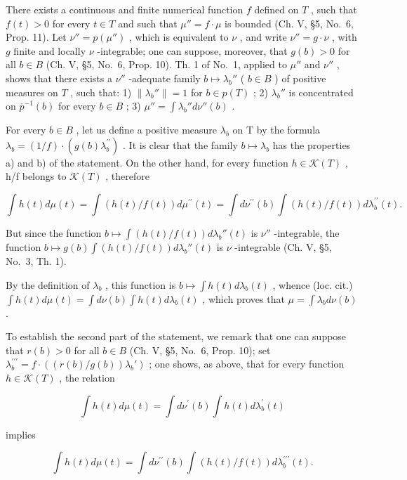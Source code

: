 There exists a continuous and finite numerical function \(f\) defined on \(T\) , such that \(f(t) > 0\) for every \(t \in T\) and such that \(\mu'' = f \cdot \mu\) is bounded (Ch. V, §5, No.~6, Prop. 11). Let \(\nu'' = p(\mu'')\) , which is equivalent to \(\nu\) , and write \(\nu'' = g \cdot \nu\) , with \(g\) finite and locally \(\nu\) -integrable; one can suppose, moreover, that \(g(b) > 0\) for all \(b \in B\) (Ch. V, §5, No.~6, Prop. 10). Th. 1 of No.~1, applied to \(\mu''\) and \(\nu''\) , shows that there exists a \(\nu''\) -adequate family \(b \mapsto \lambda_b''\) ( \(b \in B\) ) of positive measures on \(T\) , such that: 1) \(\| \lambda_b'' \| = 1\) for \(b \in p(T)\) ; 2) \(\lambda_b''\) is concentrated on \(\overline{p}^{-1}(b)\) for every \(b \in B\) ; 3) \(\mu'' = \int \lambda_b'' d\nu''(b)\) .

For every \(b \in B\) , let us define a positive measure \(\lambda_{b}\) on T by the formula \(\lambda_{b} = (1/f) \cdot (g(b)\lambda_{b}^{\prime\prime})\) . It is clear that the family \(b \mapsto \lambda_{b}\) has the properties a) and b) of the statement. On the other hand, for every function \(h \in \mathcal{K}(T)\) , h/f belongs to \(\mathcal{K}(T)\) , therefore

\[
\int h (t) d \mu (t) = \int \left(h (t) / f (t)\right) d \mu^ {\prime \prime} (t) = \int d \nu^ {\prime \prime} (b) \int \left(h (t) / f (t)\right) d \lambda_ {b} ^ {\prime \prime} (t).
\]

But since the function \(b \mapsto \int (h(t) / f(t)) d\lambda_b''(t)\) is \(\nu''\) -integrable, the function \(b \mapsto g(b) \int (h(t) / f(t)) d\lambda_b''(t)\) is \(\nu\) -integrable (Ch. V, §5, No.~3, Th. 1).

By the definition of \(\lambda_b\) , this function is \(b \mapsto \int h(t) d\lambda_b(t)\) , whence (loc. cit.) \(\int h(t) d\mu(t) = \int d\nu(b) \int h(t) d\lambda_b(t)\) , which proves that \(\mu = \int \lambda_b d\nu(b)\) .

To establish the second part of the statement, we remark that one can suppose that \(r(b) > 0\) for all \(b \in B\) (Ch. V, §5, No.~6, Prop. 10); set \(\lambda_b^{\prime \prime \prime} = f \cdot \left( \left( r(b) / g(b) \right) \lambda_b' \right)\) ; one shows, as above, that for every function \(h \in \mathcal{K}(T)\) , the relation

\[
\int h (t) d \mu (t) = \int d \nu^ {\prime} (b) \int h (t) d \lambda_ {b} ^ {\prime} (t)
\]

implies

\[
\int h (t) d \mu (t) = \int d \nu^ {\prime \prime} (b) \int \left(h (t) / f (t)\right) d \lambda_ {b} ^ {\prime \prime \prime} (t).
\]

